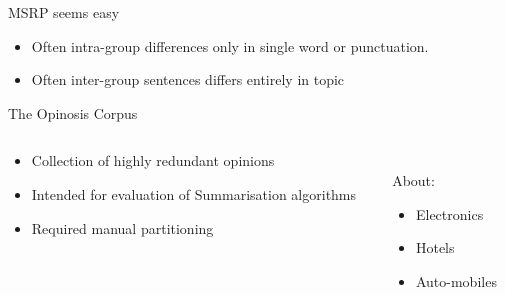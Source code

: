 \documentclass[12pt,landscape,english]{beamer}
\begin{document}
\begin{frame}{MSRP seems easy}
	\begin{itemize}
		\item Often \alert{intra-group} differences only in single word or punctuation.
		\item Often \alert{inter-group} sentences differs entirely in topic
		
	\end{itemize}
\end{frame}


\begin{frame}{The Opinosis Corpus}
	\begin{columns}
		\begin{column}[T]{0.5\textwidth}
			\begin{itemize}
				\item Collection of highly redundant opinions
				\item Intended for evaluation of Summarisation algorithms
				\item Required manual partitioning
			\end{itemize}
		\end{column}
		\begin{column}[t]{0.5\textwidth}
			\\
			About:
			\begin{itemize}
				\item Electronics
				\item Hotels
				\item Auto-mobiles
			\end{itemize}
		\end{column}
	\end{columns}
	
\end{frame}
\end{document}
